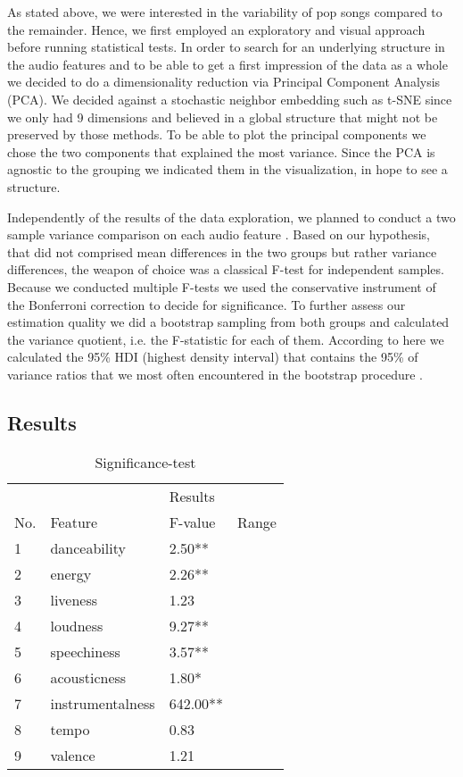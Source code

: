 \documentclass{article}
\begin{document}
As stated above, we were interested in the variability of pop songs compared to the remainder. Hence, we first employed an exploratory and visual approach before running statistical tests. In order to search for an underlying structure in the audio features and to be able to get a first impression of the data as a whole we decided to do a dimensionality reduction via Principal Component Analysis (PCA). We decided against a stochastic neighbor embedding such as t-SNE since we only had 9 dimensions and believed in a global structure that might not be preserved by those methods. To be able to plot the principal components we chose the two components that explained the most variance. Since the PCA is agnostic to the grouping we indicated them in the visualization, in hope to see a structure.

Independently of the results of the data exploration, we planned to conduct a two sample variance comparison on each audio feature \citep{snedecor1989}. Based on our hypothesis, that did not comprised mean differences in the two groups but rather variance differences, the weapon of choice was a classical F-test for independent samples. Because we conducted multiple F-tests we used the conservative instrument of the Bonferroni correction to decide for significance. To further assess our estimation quality we did a bootstrap sampling from both groups and calculated the variance quotient, i.e. the F-statistic for each of them. According to  here \cite{kruschke2014doing}
we calculated the 95\% HDI (highest density interval) that contains the 95\% of variance ratios that we most often encountered in the bootstrap procedure .

\subsection{Results}



\begin{table}[h!]
  \caption{Significance-test}
  \label{sample-table}
  \centering
  \begin{tabular}{lllc}
    \toprule
      &                     &  Results    &\\
    \cmidrule(r){3-4}
    No.     & Feature     & F-value & Range\\
    \midrule
    1 & danceability        &  2.50** &\\
	2 & energy              &  2.26** &\\
	3 & liveness            &  1.23   &\\
	4 & loudness            &  9.27** &\\
	5 & speechiness         &  3.57** &\\
	6 & acousticness        &  1.80*  &\\
	7 & instrumentalness    &642.00** &\\
	8 & tempo               &  0.83   &\\
	9 & valence             &  1.21   &\\
    \bottomrule
  \end{tabular}
\end{table}
\end{document}
